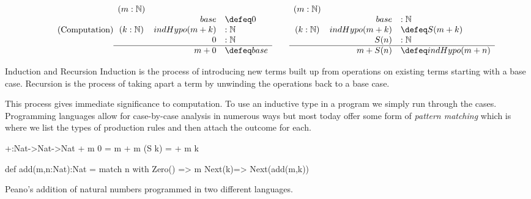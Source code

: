 \begin{gather}
    \tag{Computation}
    \begin{array}{crl}
        (m:\mathbb{N}) & & \\ %
         & base &\defeq 0\\
        (k:\mathbb{N}) &  indHypo(m+k) & :\mathbb{N}\\
        & 0& :\mathbb{N}\\
        \hline 
        & m+0 &\defeq base
    \end{array}
    \qquad
    \begin{array}{crl}
        (m:\mathbb{N}) & & \\ %
         & base &: \mathbb{N}\\
        (k:\mathbb{N}) &  indHypo(m+k) & \defeq S(m+k)\\
        & S(n) & :\mathbb{N}\\
        \hline 
        & m+S(n) &\defeq indHypo(m+n)
    \end{array}
\end{gather}



\begin{remark}{Induction and Recursion}
    Induction is the process of introducing new terms built up 
    from operations on existing terms starting with a base case.
    Recursion is the process of taking apart a term by unwinding 
    the operations back to a base case.
\end{remark}


This process gives immediate significance to computation.
To use an inductive type in a program we simply run through the cases.
Programming languages allow for case-by-case analysis in numerous ways 
but most today offer some form of \emph{pattern matching} which is 
where we list the types of production rules and then attach the outcome 
for each.
\begin{lstfloat}
\begin{center}
\begin{minipage}{0.4\textwidth}
\begin{Fcode}[]
+:Nat->Nat->Nat
+ m  0    = m
+ m (S k) = + m k
\end{Fcode}
\end{minipage}
\hfill
\begin{minipage}{0.59\textwidth}
\begin{Pcode}[]
def add(m,n:Nat):Nat =
  match n with 
    Zero() => m
    Next(k)=> Next(add(m,k))
\end{Pcode}
\end{minipage}
\end{center}
\caption{Peano's addition of natural numbers programmed in two different languages.}
\label{lst:peano}
\end{lstfloat}



